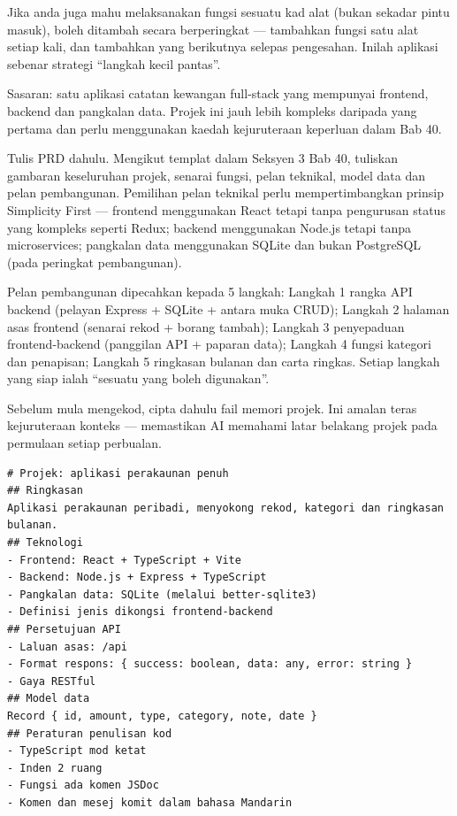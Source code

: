 Jika anda juga mahu melaksanakan fungsi sesuatu kad alat (bukan sekadar pintu masuk), boleh ditambah secara berperingkat — tambahkan fungsi satu alat setiap kali, dan tambahkan yang berikutnya selepas pengesahan. Inilah aplikasi sebenar strategi “langkah kecil pantas”.



Sasaran: satu aplikasi catatan kewangan full-stack yang mempunyai frontend, backend dan pangkalan data. Projek ini jauh lebih kompleks daripada yang pertama dan perlu menggunakan kaedah kejuruteraan keperluan dalam Bab 40.

Tulis PRD dahulu. Mengikut templat dalam Seksyen 3 Bab 40, tuliskan gambaran keseluruhan projek, senarai fungsi, pelan teknikal, model data dan pelan pembangunan. Pemilihan pelan teknikal perlu mempertimbangkan prinsip Simplicity First — frontend menggunakan React tetapi tanpa pengurusan status yang kompleks seperti Redux; backend menggunakan Node.js tetapi tanpa microservices; pangkalan data menggunakan SQLite dan bukan PostgreSQL (pada peringkat pembangunan).

Pelan pembangunan dipecahkan kepada 5 langkah: Langkah 1 rangka API backend (pelayan Express + SQLite + antara muka CRUD); Langkah 2 halaman asas frontend (senarai rekod + borang tambah); Langkah 3 penyepaduan frontend-backend (panggilan API + paparan data); Langkah 4 fungsi kategori dan penapisan; Langkah 5 ringkasan bulanan dan carta ringkas. Setiap langkah yang siap ialah “sesuatu yang boleh digunakan”.


Sebelum mula mengekod, cipta dahulu fail memori projek. Ini amalan teras kejuruteraan konteks — memastikan AI memahami latar belakang projek pada permulaan setiap perbualan.

\begin{lstlisting}
# Projek: aplikasi perakaunan penuh
## Ringkasan
Aplikasi perakaunan peribadi, menyokong rekod, kategori dan ringkasan bulanan.
## Teknologi
- Frontend: React + TypeScript + Vite
- Backend: Node.js + Express + TypeScript
- Pangkalan data: SQLite (melalui better-sqlite3)
- Definisi jenis dikongsi frontend-backend
## Persetujuan API
- Laluan asas: /api
- Format respons: { success: boolean, data: any, error: string }
- Gaya RESTful
## Model data
Record { id, amount, type, category, note, date }
## Peraturan penulisan kod
- TypeScript mod ketat
- Inden 2 ruang
- Fungsi ada komen JSDoc
- Komen dan mesej komit dalam bahasa Mandarin
\end{lstlisting}

